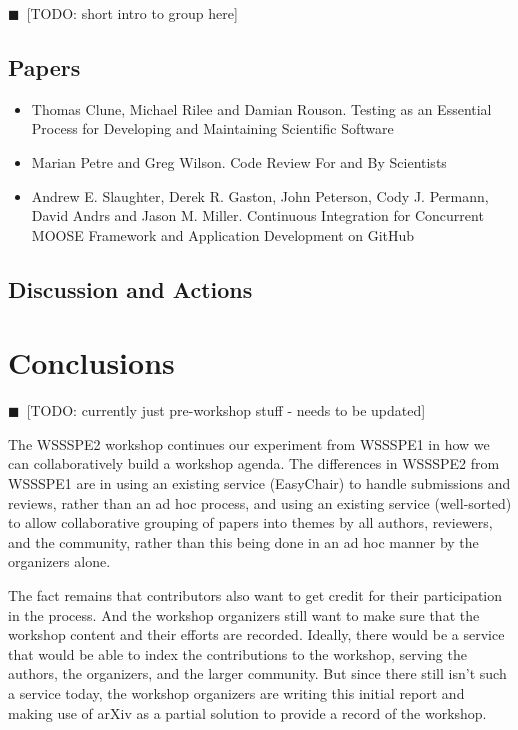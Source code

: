 \documentclass[11pt, oneside]{amsart}
\newcommand{\todo}[1]{{\color{blue}$\blacksquare$~\textsf{[TODO: #1]}}}
\begin{document}
\todo{short intro to group here}

\subsection{Papers}

\begin{itemize}
\item Thomas Clune, Michael Rilee and Damian Rouson. Testing as an Essential
Process for Developing and Maintaining Scientific Software~\cite{wssspe2_clune}

\item Marian Petre and Greg Wilson. Code Review For and By
Scientists~\cite{wssspe2_petre}

\item Andrew E. Slaughter, Derek R. Gaston, John Peterson, Cody J. Permann,
David Andrs and Jason M. Miller. Continuous Integration for Concurrent {MOOSE}
Framework and Application Development on {GitHub}~\cite{wssspe2_slaughter}
\end{itemize}

\subsection{Discussion and Actions}

\section{Conclusions}
\todo{currently just pre-workshop stuff - needs to be updated}

The WSSSPE2 workshop continues our experiment from WSSSPE1 in how we can
collaboratively build a workshop agenda. The differences in WSSSPE2 from WSSSPE1
are in using an existing service (EasyChair) to handle submissions and reviews,
rather than an ad hoc process, and using an existing service (well-sorted) to
allow collaborative grouping of papers into themes by all authors, reviewers,
and the community, rather than this being done in an ad hoc manner by the
organizers alone.

The fact remains that contributors also want to get credit for their
participation in the process. And the workshop organizers still want to make
sure that the workshop content and their efforts are recorded. Ideally, there
would be a service that would be able to index the contributions to the
workshop, serving the authors, the organizers, and the larger community. But
since there still isn't such a service today, the workshop organizers are
writing this initial report and making use of arXiv as a partial solution to
provide a record of the workshop.
\end{document}
